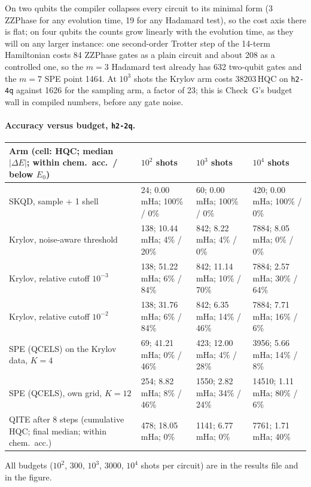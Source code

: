 \documentclass[11pt,a4paper]{article}
\begin{document}
On two qubits the compiler collapses every circuit to its minimal form (3 ZZPhase for any evolution time, 19 for any Hadamard test), so the cost axis there is flat; on four qubits the counts grow linearly with the evolution time, as they will on any larger instance: one second-order Trotter step of the 14-term Hamiltonian costs 84 ZZPhase gates as a plain circuit and about 208 as a controlled one, so the $m=3$ Hadamard test already has 632 two-qubit gates and the $m=7$ SPE point 1464. At $10^3$ shots the Krylov arm costs 38203\,HQC on \texttt{h2-4q} against 1626 for the sampling arm, a factor of 23; this is Check~G's budget wall in compiled numbers, before any gate noise.

\paragraph{Accuracy versus budget, \texttt{h2-2q}.}
\begin{center}\footnotesize
\begin{tabularx}{\linewidth}{@{}L{4.1cm}YYY@{}}
\toprule
Arm (cell: HQC; median $|\Delta E|$; within chem.\ acc.\ / below $E_0$) & $10^{2}$ shots & $10^{3}$ shots & $10^{4}$ shots\\\midrule
SKQD, sample + 1 shell & 24; 0.00\,mHa; 100\% / 0\% & 60; 0.00\,mHa; 100\% / 0\% & 420; 0.00\,mHa; 100\% / 0\%\\
Krylov, noise-aware threshold & 138; 10.44\,mHa; 4\% / 20\% & 842; 8.22\,mHa; 4\% / 0\% & 7884; 8.05\,mHa; 0\% / 0\%\\
Krylov, relative cutoff $10^{-3}$ & 138; 51.22\,mHa; 6\% / 84\% & 842; 11.14\,mHa; 10\% / 70\% & 7884; 2.57\,mHa; 30\% / 64\%\\
Krylov, relative cutoff $10^{-2}$ & 138; 31.76\,mHa; 6\% / 84\% & 842; 6.35\,mHa; 14\% / 46\% & 7884; 7.71\,mHa; 16\% / 6\%\\
SPE (QCELS) on the Krylov data, $K=4$ & 69; 41.21\,mHa; 0\% / 46\% & 423; 12.00\,mHa; 4\% / 28\% & 3956; 5.66\,mHa; 14\% / 8\%\\
SPE (QCELS), own grid, $K=12$ & 254; 8.82\,mHa; 8\% / 46\% & 1550; 2.82\,mHa; 34\% / 24\% & 14510; 1.11\,mHa; 80\% / 6\%\\
QITE after 8 steps (cumulative HQC; final median; within chem.\ acc.) & 478; 18.05\,mHa; 0\% & 1141; 6.77\,mHa; 0\% & 7761; 1.71\,mHa; 40\%\\
\bottomrule
\end{tabularx}
\end{center}
All budgets ($10^{2}$, 300, $10^{3}$, 3000, $10^{4}$ shots per circuit) are in the results file and in the figure.
\end{document}
